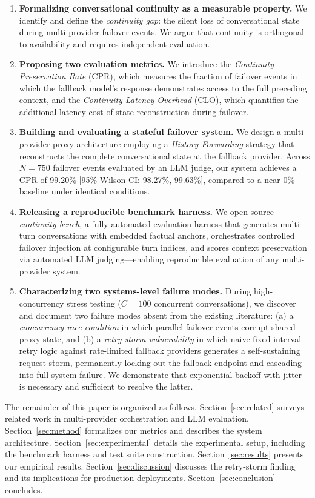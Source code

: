 \begin{enumerate}
    \item \textbf{Formalizing conversational continuity as a measurable property.} We identify and define the \textit{continuity gap}: the silent loss of conversational state during multi-provider failover events. We argue that continuity is orthogonal to availability and requires independent evaluation.

    \item \textbf{Proposing two evaluation metrics.} We introduce the \textit{Continuity Preservation Rate} (CPR), which measures the fraction of failover events in which the fallback model's response demonstrates access to the full preceding context, and the \textit{Continuity Latency Overhead} (CLO), which quantifies the additional latency cost of state reconstruction during failover.

    \item \textbf{Building and evaluating a stateful failover system.} We design a multi-provider proxy architecture employing a \textit{History-Forwarding} strategy that reconstructs the complete conversational state at the fallback provider. Across $N=750$ failover events evaluated by an LLM judge, our system achieves a CPR of 99.20\% [95\% Wilson CI: 98.27\%, 99.63\%], compared to a near-0\% baseline under identical conditions.

    \item \textbf{Releasing a reproducible benchmark harness.} We open-source \textit{continuity-bench}, a fully automated evaluation harness that generates multi-turn conversations with embedded factual anchors, orchestrates controlled failover injection at configurable turn indices, and scores context preservation via automated LLM judging---enabling reproducible evaluation of any multi-provider system.

    \item \textbf{Characterizing two systems-level failure modes.} During high-concurrency stress testing ($C=100$ concurrent conversations), we discover and document two failure modes absent from the existing literature: (a) a \textit{concurrency race condition} in which parallel failover events corrupt shared proxy state, and (b) a \textit{retry-storm vulnerability} in which naive fixed-interval retry logic against rate-limited fallback providers generates a self-sustaining request storm, permanently locking out the fallback endpoint and cascading into full system failure. We demonstrate that exponential backoff with jitter is necessary and sufficient to resolve the latter.
\end{enumerate}

The remainder of this paper is organized as follows. Section~\ref{sec:related} surveys related work in multi-provider orchestration and LLM evaluation. Section~\ref{sec:method} formalizes our metrics and describes the system architecture. Section~\ref{sec:experimental} details the experimental setup, including the benchmark harness and test suite construction. Section~\ref{sec:results} presents our empirical results. Section~\ref{sec:discussion} discusses the retry-storm finding and its implications for production deployments. Section~\ref{sec:conclusion} concludes.
